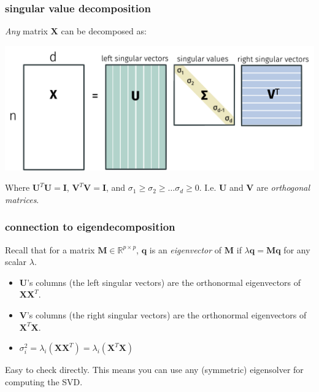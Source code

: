 \documentclass[handout,compress]{beamer}
\newcommand{\bv}[1]{\mathbf{#1}}
\newcommand{\R}{\mathbb{R}}
\begin{document}
\begin{frame}
	\frametitle{singular value decomposition}
	\small
	\emph{Any} matrix $\bv{X}$ can be decomposed as:
	\begin{center}
		\includegraphics[width=.9\textwidth]{svd.png}
	\end{center} 
	Where $\bv{U}^T\bv{U} = \bv{I}$,  $\bv{V}^T\bv{V} = \bv{I}$, and $\sigma_1 \geq \sigma_2 \geq \ldots \sigma_d \geq 0$. I.e. $\bv{U}$ and $\bv{V}$ are \emph{orthogonal matrices}.
\end{frame}

\begin{frame}[t]
	\frametitle{connection to eigendecomposition}
	Recall that for a matrix $\bv{M}\in \R^{p\times p}$, $\bv{q}$ is an \emph{eigenvector} of $\bv{M}$ if $\lambda \bv{q} = \bv{M}\bv{q}$ for any scalar $\lambda$. 
	\begin{itemize}
		\item $\bv{U}$'s columns (the left singular vectors) are the orthonormal eigenvectors of $\bv{X}\bv{X}^T$. 
		\item $\bv{V}$'s columns (the right singular vectors) are the orthonormal eigenvectors of $\bv{X}^T\bv{X}$. 
		\item $\sigma_i^2 = \lambda_i(\bv{X}\bv{X}^T) = \lambda_i(\bv{X}^T\bv{X})$
	\end{itemize}
Easy to check directly. This means you can use any (symmetric) eigensolver for computing the SVD. 
\end{frame}
\end{document}
